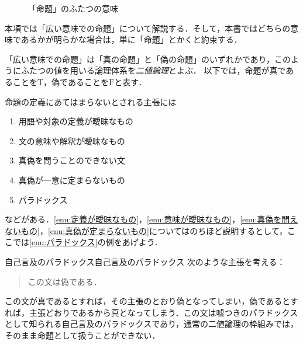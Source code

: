 \begin{figure}[h]
  \caption{「命題」のふたつの意味}
  \label{fig:命題のふたつの意味}
\end{figure}

本項では「広い意味での命題」について解説する．そして，本書ではどちらの意味であるかが明らかな場合は，単に「命題」とかくと約束する．

「広い意味での命題」は「真の命題」と「偽の命題」のいずれかであり，このようにふたつの値を用いる論理体系を\emph{二値論理}とよぶ．
以下では，命題が真であることを$\mathrm{T}$，偽であることを$\mathrm{F}$と表す．

命題の定義にあてはまらないとされる主張には

\begin{enumerate}[(1)]
\item 用語や対象の定義が曖昧なもの
  \label{enu:定義が曖昧なもの}
\item 文の意味や解釈が曖昧なもの
  \label{enu:意味が曖昧なもの}
\item 真偽を問うことのできない文
  \label{enu:真偽を問えないもの}
\item 真偽が一意に定まらないもの
  \label{enu:真偽が定まらないもの}
\item パラドックス
  \label{enu:パラドックス}
\end{enumerate}

などがある．\ref{enu:定義が曖昧なもの}，\ref{enu:意味が曖昧なもの}，\ref{enu:真偽を問えないもの}，\ref{enu:真偽が定まらないもの}についてはのちほど説明するとして，ここでは\ref{enu:パラドックス}の例をあげよう．

\begin{example}{自己言及のパラドックス}{自己言及のパラドックス}
次のような主張を考える：
\begin{quote}
この文は偽である．
\end{quote}
この文が真であるとすれば，その主張のとおり偽となってしまい，偽であるとすれば，主張どおりであるから真となってしまう．この文は嘘つきのパラドックスとして知られる自己言及のパラドックスであり，通常の二値論理の枠組みでは，そのまま命題として扱うことができない．
\end{example}

